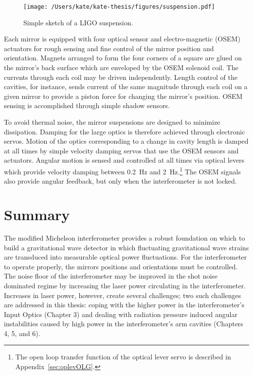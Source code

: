 \begin{figure}
\begin{centering}
\texttt{[image: /Users/kate/kate-thesis/figures/suspension.pdf]}
\caption[Simple sketch of a LIGO suspension]{Simple sketch of a LIGO suspension.}
\label{fig:suspension}
\end{centering}
\end{figure}

Each mirror is equipped with four optical sensor and electro-magnetic
(OSEM) actuators for rough sensing and fine control of the mirror
position and orientation. Magnets arranged to form the four corners of
a square are glued on the mirror's back surface which are enveloped by
the OSEM solenoid coil.  The currents through each coil may be driven
independently.  Length control of the cavities, for instance, sends
current of the same magnitude through each coil on a given mirror to
provide a piston force for changing the mirror's position. OSEM
sensing is accomplished through simple shadow sensors.

To avoid thermal noise, the mirror suspensions are designed to
minimize dissipation.  Damping for the large optics is therefore
achieved through electronic servos.  Motion of the optics
corresponding to a change in cavity length is damped at all times by
simple velocity damping servos that use the OSEM sensors and
actuators. Angular motion is sensed and controlled at all times via
optical levers which provide velocity damping between 0.2~Hz and
2~Hz.\footnote{ The open loop transfer function of the optical lever
  servo is described in Appendix~\ref{sec:oplevOLG}.} The OSEM signals
also provide angular feedback, but only when the interferometer is not
locked. 


\section{Summary}
The modified Michelson interferometer provides a robust foundation on
which to build a gravitational wave detector in which fluctuating
gravitational wave strains are transduced into measurable optical
power fluctuations.  For the interferometer to operate properly, the
mirrors positions and orientations must be controlled.  The noise
floor of the interferometer may be improved in the shot noise
dominated regime by increasing the laser power circulating in the
interferometer.  Increases in laser power, however, create several
challenges; two such challenges are addressed in this thesis: coping
with the higher power in the interferometer's Input Optics (Chapter 3)
and dealing with radiation pressure induced angular instabilities
caused by high power in the interferometer's arm cavities (Chapters 4,
5, and 6).
